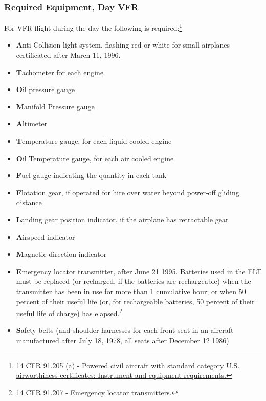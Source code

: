 \documentclass[12pt]{article}
\begin{document}
		\subsubsection{Required Equipment, Day VFR}
			For VFR flight during the day the following is required:\footnote{\href{https://www.law.cornell.edu/cfr/text/14/91.205\#a}{14 CFR 91.205 (a) - Powered civil aircraft with standard category U.S. airworthiness certificates: Instrument and equipment requirements.}}
			\begin{itemize}
				\item \textbf{A}nti-Collision light system, flashing red or white for small airplanes certificated after March 11, 1996.
				\item \textbf{T}achometer for each engine
				\item \textbf{O}il pressure gauge 
				\item \textbf{M}anifold Pressure gauge
				\item \textbf{A}ltimeter
				\item \textbf{T}emperature gauge, for each liquid cooled engine
				\item \textbf{O}il Temperature gauge, for each air cooled engine
				\item \textbf{F}uel gauge indicating the quantity in each tank
				\item \textbf{F}lotation gear, if operated for hire over water beyond power-off gliding distance
				\item \textbf{L}anding gear position indicator, if the airplane has retractable gear
				\item \textbf{A}irspeed indicator
				\item \textbf{M}agnetic direction indicator
				\item \textbf{E}mergency locator transmitter, after June 21 1995. Batteries used in the ELT must be replaced (or recharged, if the batteries are rechargeable) when the transmitter has been in use for more than 1 cumulative hour; or when 50 percent of their useful life (or, for rechargeable batteries, 50 percent of their useful life of charge) has elapsed.\footnote{\href{https://www.law.cornell.edu/cfr/text/14/91.207}{14 CFR 91.207 - Emergency locator transmitters.}}
				\item \textbf{S}afety belts (and shoulder harnesses for each front seat in an aircraft manufactured after July 18, 1978, all seats after December 12 1986)
			\end{itemize}
\end{document}
